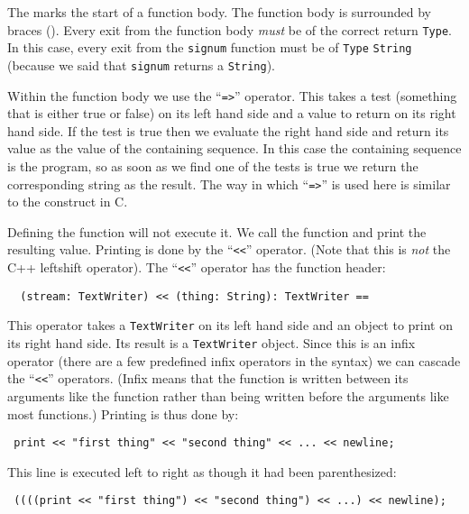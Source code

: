 The \ttin{==} marks the start of a function body. The function body is
surrounded by braces (\ttin{\{ \}}). Every exit from the function body
{\em must\/} be of the correct return \verb"Type". In this case, every exit from the 
\verb"signum" function must be of \verb"Type" \verb"String" (because we said that \verb"signum"
returns a \verb"String").

Within the function body we use the ``\verb+=>+'' operator. This takes a
test (something that is either true or false) on its left 
hand side and a value to return on its right hand side. If the 
test is true then we evaluate the right hand side and return 
its value as the value of the containing sequence. In this case the 
containing sequence is the program, so as soon as we find one of the 
tests is true we return the corresponding string as the result. 
The way in which ``\verb"=>"'' is used here is similar to the 
construct in C.

Defining the function will not execute it. We call the function and
print the resulting value. Printing is done by the ``\verb+<<+'' operator.
(Note that this is {\em not\/} the C++ leftshift operator).
The ``\verb+<<+'' operator has the function header:

\begin{small}
\begin{verbatim}
  (stream: TextWriter) << (thing: String): TextWriter ==
\end{verbatim}
\end{small}

This operator takes a \verb"TextWriter" on its left hand side and
an object to print on its right hand side. Its result is a \verb"TextWriter"
object. Since this is an infix operator (there are a few predefined
infix operators in the syntax) we can cascade the ``\verb+<<+'' operators.
(Infix means that the function is written between its arguments like
the \ttin{+} function rather than being written before the arguments like
most functions.) Printing is thus done by:

\begin{small}
\begin{verbatim}
 print << "first thing" << "second thing" << ... << newline;
\end{verbatim}
\end{small}

This line is executed left to right as though it had been
parenthesized:

\begin{small}
\begin{verbatim}
 ((((print << "first thing") << "second thing") << ...) << newline);
\end{verbatim}
\end{small}

